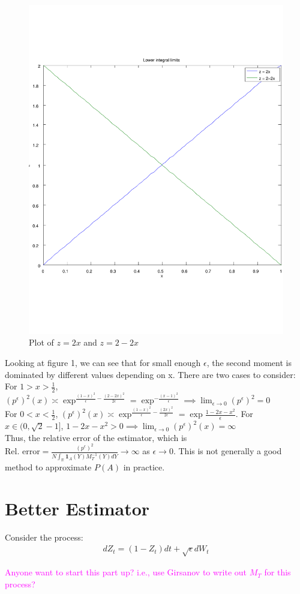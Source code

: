 \documentclass[11pt]{amsart}
\newcommand{\noise}{\sqrt{\epsilon}}
\newcommand{\kknote}[1]{{\textcolor{magenta}{#1}}}
\begin{document}
\begin{figure}[h]
\caption{Plot of $z = 2x$ and $z = 2-2x$}
\includegraphics[scale=0.4]{plot.pdf}
\end{figure}
Looking at figure 1, we can see that for small enough $\epsilon$, the second moment is dominated by different values depending on x. There are two cases to consider: 
\\
For $1 > x > \frac{1}{2}$, $(p^{\epsilon})^2(x) \asymp \exp^{\frac{(1-x)^2}{\epsilon}-\frac{(2-2x)^2}{2\epsilon}} = \exp^{-\frac{(x-1)^2}{\epsilon}} \implies \lim_{\epsilon \to 0} (p^{\epsilon})^2 = 0$
\\
For $0 < x < \frac{1}{2}$, $(p^{\epsilon})^2(x) \asymp \exp^{\frac{(1-x)^2}{\epsilon}-\frac{(2x)^2}{2\epsilon}} = \exp{\frac{1-2x-x^2}{\epsilon}}$. For $x \in (0,\sqrt{2}-1]$, $1-2x-x^2 > 0 \implies \lim_{\epsilon \to 0} (p^{\epsilon})^2(x) = \infty$ 
\\
Thus, the relative error of the estimator, which is $\text{Rel. error} = \frac{(p^{\epsilon})^2}{N\int_{\mathbb{R}}\mathbf{1}_{A}(Y)M^{-1}_{T}(Y) dY} \to \infty$ as $\epsilon \to 0$. This is not generally a good method to approximate $P(A)$ in practice. 

\section{Better Estimator}
Consider the process: 
\begin{align*}
dZ_t = (1-Z_t)dt + \noise dW_t
\end{align*}

\kknote{Anyone want to start this part up? i.e., use Girsanov to write out $M_T$ for this process?}
\end{document}
